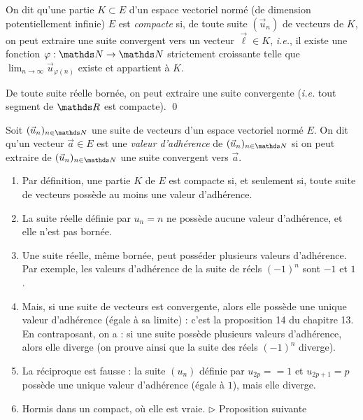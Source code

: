 \begin{defn}
	On dit qu'une partie $K \subset E$ d'un espace vectoriel normé (de dimension potentiellement infinie) $E$ est \textit{compacte} si, de toute suite $(\vec{u}_n)$ de vecteurs de $K$, on peut extraire une suite convergent vers un vecteur $\vec{\ell} \in K$, \textit{i.e.}, il existe une fonction $\varphi : \N\to \N$ strictement croissante telle que $\lim_{n\to \infty} \vec{u}_{\varphi(n)}$ existe et appartient à $K$.
\end{defn}

\begin{thm}
	De toute suite réelle bornée, on peut extraire une suite convergente (\textit{i.e.} tout segment de $\R$ est compacte).
	\qed
\end{thm}

\begin{rmk}
	Soit $(\vec{u}_n)_{n\in\N}$\/ une suite de vecteurs d'un espace vectoriel normé $E$.
	On dit qu'un vecteur $\vec{a} \in E$ est une \textit{valeur d'adhérence} de $(\vec{u}_n)_{n\in\N}$ si on peut extraire de $(\vec{u}_n)_{n\in\N}$ une suite convergent vers $\vec{a}$.
	\begin{enumerate}
		\item Par définition, une partie $K$ de $E$ est compacte si, et seulement si, toute suite de vecteurs possède au moins une valeur d'adhérence.
		\item La suite réelle définie par $u_n = n$ ne possède aucune valeur d'adhérence, et elle n'est pas bornée. 
		\item Une suite réelle, même bornée, peut posséder plusieurs valeurs d'adhérence.
			Par exemple, les valeurs d'adhérence de la suite de réels $(-1)^n$ sont $-1$ et $1$.
		\item Mais, si une suite de vecteurs est convergente, alors elle possède une unique valeur d'adhérence (égale à sa limite) : c'est la proposition 14 du chapitre 13.
			En contraposant, on a : si une suite possède plusieurs valeurs d'adhérence, alors elle diverge (on prouve ainsi que la suite des réels $(-1)^n$ diverge).
		\item La réciproque est fausse : la suite $(u_n)$ définie par $u_{2p} = =1$ et $u_{2p+1} = p$ possède une unique valeur d'adhérence (égale à $1$), mais elle diverge.
		\item Hormis dans un compact, où elle est vraie. $\triangleright$ Proposition suivante
	\end{enumerate}
\end{rmk}

